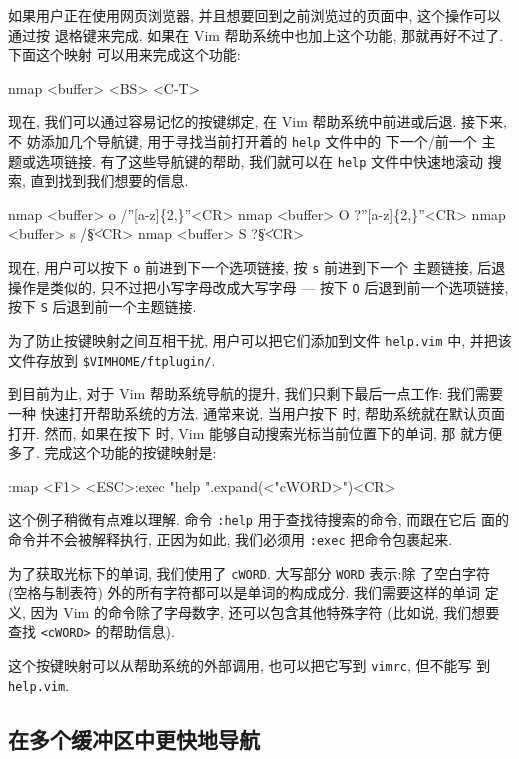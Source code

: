 如果用户正在使用网页浏览器, 并且想要回到之前浏览过的页面中, 这个操作可以通过按
退格键来完成. 如果在 Vim 帮助系统中也加上这个功能, 那就再好不过了. 下面这个映射
可以用来完成这个功能:
\begin{vimcode}
nmap <buffer> <BS> <C-T>
\end{vimcode}

现在, 我们可以通过容易记忆的按键绑定, 在 Vim 帮助系统中前进或后退. 接下来, 不
妨添加几个导航键, 用于寻找当前打开着的 \texttt{help} 文件中的 下一个/前一个 主
题或选项链接. 有了这些导航键的帮助, 我们就可以在 \texttt{help} 文件中快速地滚动
搜索, 直到找到我们想要的信息.
\begin{vimcode}
nmap <buffer> o /''[a-z]\{2,\}''<CR>
nmap <buffer> O ?''[a-z]\{2,\}''<CR>
nmap <buffer> s /\|\S\+\|<CR>
nmap <buffer> S ?\|\S\+\|<CR>
\end{vimcode}

现在, 用户可以按下 \texttt{o} 前进到下一个选项链接, 按 \texttt{s} 前进到下一个
主题链接, 后退操作是类似的, 只不过把小写字母改成大写字母 --- 按下 \texttt{O}
后退到前一个选项链接, 按下 \texttt{S} 后退到前一个主题链接.

\begin{warning}
    为了防止按键映射之间互相干扰, 用户可以把它们添加到文件 \texttt{help.vim} 中,
    并把该文件存放到 \verb'$VIMHOME/ftplugin/'.
\end{warning}

到目前为止, 对于 Vim 帮助系统导航的提升, 我们只剩下最后一点工作: 我们需要一种
快速打开帮助系统的方法. 通常来说, 当用户按下  时, 帮助系统就在默认页面
打开. 然而, 如果在按下  时, Vim 能够自动搜索光标当前位置下的单词, 那
就方便多了. 完成这个功能的按键映射是:
\begin{vimcode}
:map <F1> <ESC>:exec "help ".expand(<"cWORD>")<CR>
\end{vimcode}
这个例子稍微有点难以理解. 命令 \texttt{:help} 用于查找待搜索的命令, 而跟在它后
面的命令并不会被解释执行, 正因为如此, 我们必须用 \texttt{:exec} 把命令包裹起来.

为了获取光标下的单词, 我们使用了 \texttt{cWORD}. 大写部分 \texttt{WORD} 表示:除
了空白字符 (空格与制表符) 外的所有字符都可以是单词的构成成分. 我们需要这样的单词
定义, 因为 Vim 的命令除了字母数字, 还可以包含其他特殊字符 (比如说, 我们想要查找
\texttt{<cWORD>} 的帮助信息).

这个按键映射可以从帮助系统的外部调用, 也可以把它写到 \texttt{vimrc}, 但不能写
到 \texttt{help.vim}.

\subsection{在多个缓冲区中更快地导航}
\label{subsec:faster_navigation_in_multiple_buffers}


